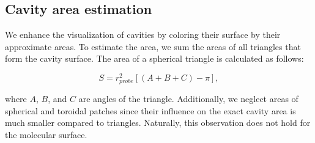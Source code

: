 \subsection{Cavity area estimation}\label{sec:area}
We enhance the visualization of cavities by coloring their surface by their approximate areas.
To estimate the area, we sum the areas of all triangles that form the cavity surface.
The area of a spherical triangle is calculated as follows:

\begin{equation}
  S = r_{probe}^2 \left[ \left( A + B + C \right) - \pi \right],
\end{equation}

where $A$, $B$, and $C$ are angles of the triangle. 
Additionally, we neglect areas of spherical and toroidal patches since their influence on the exact cavity area is much smaller compared to triangles.
Naturally, this observation does not hold for the molecular surface.
